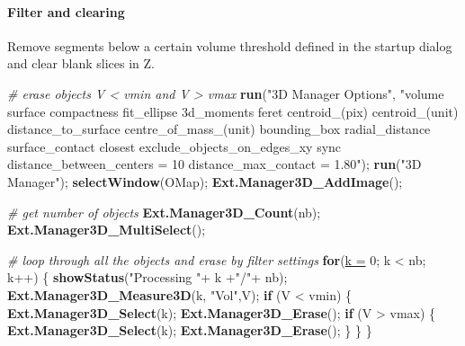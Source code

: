 \documentclass[11pt,singlespacinge,twoside]{reedthesis} %
\newenvironment{Shaded}{}{}
\newcommand{\CommentTok}[1]{\textit{#1}}
\newcommand{\ControlFlowTok}[1]{\textbf{#1}}
\newcommand{\DataTypeTok}[1]{\underline{#1}}
\newcommand{\DecValTok}[1]{#1}
\newcommand{\KeywordTok}[1]{\textbf{#1}}
\newcommand{\NormalTok}[1]{#1}
\newcommand{\OperatorTok}[1]{#1}
\newcommand{\StringTok}[1]{#1}
\theoremstyle{definition}
\theoremstyle{definition}
\theoremstyle{definition}
\theoremstyle{remark}
\begin{document}
\hypertarget{filter-and-clearing}{%
\paragraph{Filter and clearing}\label{filter-and-clearing}}

Remove segments below a certain volume threshold defined in the startup dialog and clear blank slices in Z.

\scriptsize
\begin{Shaded}
\begin{Highlighting}[numbers=left,,]
\CommentTok{# erase objects V < vmin and V > vmax}
  \KeywordTok{run}\NormalTok{(}\StringTok{"3D Manager Options"}\NormalTok{, }\StringTok{"volume surface compactness fit_ellipse 3d_moments }
\StringTok{      feret centroid_(pix) centroid_(unit) distance_to_surface centre_of_mass_(unit) }
\StringTok{      bounding_box radial_distance surface_contact closest exclude_objects_on_edges_xy }
\StringTok{      sync distance_between_centers = 10 distance_max_contact = 1.80"}\NormalTok{);}
    \KeywordTok{run}\NormalTok{(}\StringTok{"3D Manager"}\NormalTok{);}
  \KeywordTok{selectWindow}\NormalTok{(OMap);}
    \KeywordTok{Ext.Manager3D_AddImage}\NormalTok{();}

\CommentTok{# get number of objects}
    \KeywordTok{Ext.Manager3D_Count}\NormalTok{(nb);}
    \KeywordTok{Ext.Manager3D_MultiSelect}\NormalTok{();}

\CommentTok{# loop through all the objects and erase by filter settings}
    \ControlFlowTok{for}\NormalTok{(}\DataTypeTok{k =} \DecValTok{0}\NormalTok{; k }\OperatorTok{<}\StringTok{ }\NormalTok{nb; k}\OperatorTok{++}\NormalTok{) \{}
        \KeywordTok{showStatus}\NormalTok{(}\StringTok{"Processing "}\OperatorTok{+}\StringTok{ }\NormalTok{k }\OperatorTok{+}\StringTok{"/"}\OperatorTok{+}\StringTok{ }\NormalTok{nb);}
        \KeywordTok{Ext.Manager3D_Measure3D}\NormalTok{(k, }\StringTok{"Vol"}\NormalTok{,V);}
        \ControlFlowTok{if}\NormalTok{ (V }\OperatorTok{<}\StringTok{ }\NormalTok{vmin) \{}
            \KeywordTok{Ext.Manager3D_Select}\NormalTok{(k);}
            \KeywordTok{Ext.Manager3D_Erase}\NormalTok{();}
            \ControlFlowTok{if}\NormalTok{ (V }\OperatorTok{>}\StringTok{ }\NormalTok{vmax) \{}
                \KeywordTok{Ext.Manager3D_Select}\NormalTok{(k);}
                \KeywordTok{Ext.Manager3D_Erase}\NormalTok{();}
\NormalTok{            \}}
\NormalTok{        \}}
\NormalTok{    \}}


\end{Highlighting}
\end{Shaded}
\end{document}
